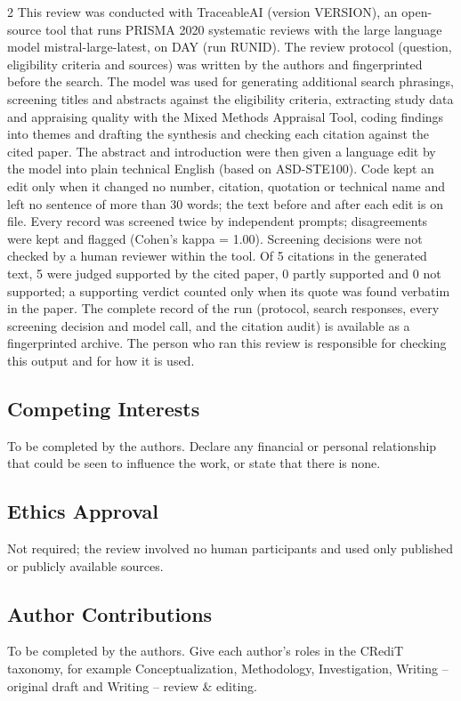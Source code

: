 \documentclass[10pt,a4paper]{article}
\begin{document}
\begin{multicols*}{2}
This review was conducted with TraceableAI (version VERSION), an open-source tool that runs PRISMA 2020 systematic reviews with the large language model mistral-large-latest, on DAY (run RUNID).
The review protocol (question, eligibility criteria and sources) was written by the authors and fingerprinted before the search.
The model was used for generating additional search phrasings, screening titles and abstracts against the eligibility criteria, extracting study data and appraising quality with the Mixed Methods Appraisal Tool, coding findings into themes and drafting the synthesis and checking each citation against the cited paper.
The abstract and introduction were then given a language edit by the model into plain technical English (based on ASD-STE100).
Code kept an edit only when it changed no number, citation, quotation or technical name and left no sentence of more than 30 words; the text before and after each edit is on file.
Every record was screened twice by independent prompts; disagreements were kept and flagged (Cohen's kappa = 1.00).
Screening decisions were not checked by a human reviewer within the tool.
Of 5 citations in the generated text, 5 were judged supported by the cited paper, 0 partly supported and 0 not supported; a supporting verdict counted only when its quote was found verbatim in the paper.
The complete record of the run (protocol, search responses, every screening decision and model call, and the citation audit) is available as a fingerprinted archive.
The person who ran this review is responsible for checking this output and for how it is used.

\subsection{Competing Interests}\label{sec:competing-interests}

To be completed by the authors.
Declare any financial or personal relationship that could be seen to influence the work, or state that there is none.

\subsection{Ethics Approval}\label{sec:ethics-approval}

Not required; the review involved no human participants and used only published or publicly available sources.

\subsection{Author Contributions}\label{sec:author-contributions}

To be completed by the authors.
Give each author's roles in the CRediT taxonomy, for example Conceptualization, Methodology, Investigation, Writing – original draft and Writing – review \& editing.

\end{multicols*}
\end{document}
